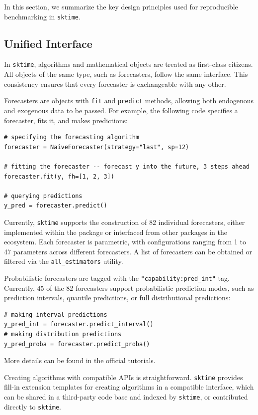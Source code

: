 In this section, we summarize the key design principles used for reproducible benchmarking in \texttt{sktime}.

\subsection{Unified Interface}
In \texttt{sktime}, algorithms and mathematical objects are treated as first-class citizens. All objects of the same type, such as forecasters, follow the same interface. This consistency ensures that every forecaster is exchangeable with any other.

Forecasters are objects with \texttt{fit} and \texttt{predict} methods, allowing both endogenous and exogenous data to be passed. For example, the following code specifies a forecaster, fits it, and makes predictions:

\begin{verbatim}
# specifying the forecasting algorithm
forecaster = NaiveForecaster(strategy="last", sp=12)

# fitting the forecaster -- forecast y into the future, 3 steps ahead
forecaster.fit(y, fh=[1, 2, 3])

# querying predictions
y_pred = forecaster.predict()
\end{verbatim}

Currently, \texttt{sktime} supports the construction of 82 individual forecasters, either implemented within the package or interfaced from other packages in the ecosystem. Each forecaster is parametric, with configurations ranging from 1 to 47 parameters across different forecasters. A list of forecasters can be obtained or filtered via the \texttt{all\_estimators} utility.

Probabilistic forecasters are tagged with the \texttt{"capability:pred\_int"} tag. Currently, 45 of the 82 forecasters support probabilistic prediction modes, such as prediction intervals, quantile predictions, or full distributional predictions:

\begin{verbatim}
# making interval predictions
y_pred_int = forecaster.predict_interval()
# making distribution predictions
y_pred_proba = forecaster.predict_proba()
\end{verbatim}

More details can be found in the official tutorials.

Creating algorithms with compatible APIs is straightforward. \texttt{sktime} provides fill-in extension templates for creating algorithms in a compatible interface, which can be shared in a third-party code base and indexed by \texttt{sktime}, or contributed directly to \texttt{sktime}.

